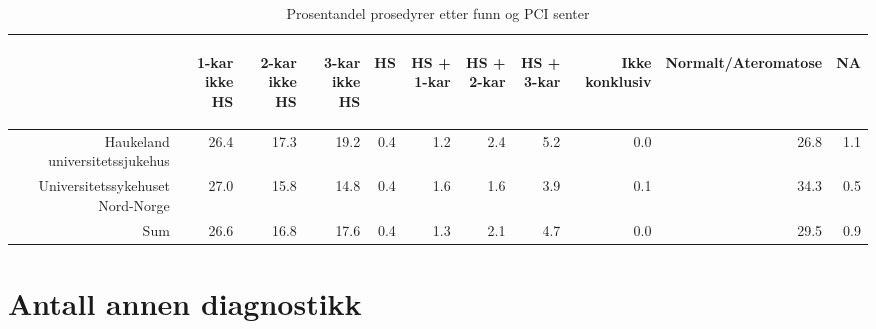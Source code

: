 \documentclass[norsk, a4paper]{report}
\begin{document}
\begin{tiny}
\begin{table}[ht]
\centering
\begin{tabular}{rrrrrrrrrrr}
  \toprule
 & \begin{sideways} 1-kar ikke HS \end{sideways} & \begin{sideways} 2-kar ikke HS \end{sideways} & \begin{sideways} 3-kar ikke HS \end{sideways} & \begin{sideways} HS \end{sideways} & \begin{sideways} HS + 1-kar \end{sideways} & \begin{sideways} HS + 2-kar \end{sideways} & \begin{sideways} HS + 3-kar \end{sideways} & \begin{sideways} Ikke konklusiv \end{sideways} & \begin{sideways} Normalt/Ateromatose \end{sideways} & \begin{sideways} NA \end{sideways} \\ 
  \midrule
Haukeland universitetssjukehus & 26.4 & 17.3 & 19.2 & 0.4 & 1.2 & 2.4 & 5.2 & 0.0 & 26.8 & 1.1 \\ 
  Universitetssykehuset Nord-Norge & 27.0 & 15.8 & 14.8 & 0.4 & 1.6 & 1.6 & 3.9 & 0.1 & 34.3 & 0.5 \\ 
  Sum & 26.6 & 16.8 & 17.6 & 0.4 & 1.3 & 2.1 & 4.7 & 0.0 & 29.5 & 0.9 \\ 
   \bottomrule
\end{tabular}
\caption{Prosentandel prosedyrer etter funn og PCI senter} 
\label{tab:pros:funn}
\end{table}\end{tiny}



\clearpage
\section{Antall annen diagnostikk}
\end{document}
